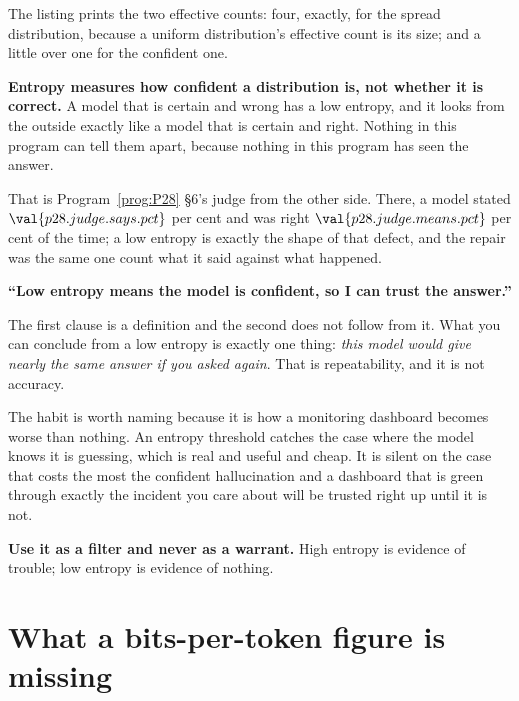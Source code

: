 \begin{fr}


The listing prints the two effective counts: four, exactly, for the spread
distribution, because a uniform distribution's effective count is its size;
and a little over one for the confident one.

\textbf{Entropy measures how confident a distribution is, not whether it is
correct.} A model that is certain and wrong has a low entropy, and it looks
from the outside exactly like a model that is certain and right. Nothing in
this program can tell them apart, because nothing in this program has seen the
answer.

That is Program~\ref{prog:P28} §6's judge from the other side. There, a model
stated $\val{p28.judge.says.pct}$ per cent and was right
$\val{p28.judge.means.pct}$ per cent of the time; a low entropy is exactly the
shape of that defect, and the repair was the same one \dash{} count what it
said against what happened.
\end{fr}

\begin{fr}
\begin{trapbox}
\textbf{\enquote{Low entropy means the model is confident, so I can trust the
answer.}}

The first clause is a definition and the second does not follow from it. What
you can conclude from a low entropy is exactly one thing: \emph{this model
would give nearly the same answer if you asked again}. That is repeatability,
and it is not accuracy.

The habit is worth naming because it is how a monitoring dashboard becomes
worse than nothing. An entropy threshold catches the case where the model
knows it is guessing, which is real and useful and cheap. It is silent on the
case that costs the most \dash{} the confident hallucination \dash{} and a
dashboard that is green through exactly the incident you care about will be
trusted right up until it is not.

\textbf{Use it as a filter and never as a warrant.} High entropy is evidence
of trouble; low entropy is evidence of nothing.
\end{trapbox}
\end{fr}

\section{What a bits-per-token figure is missing}
\label{sec:P29-tokeniser}

